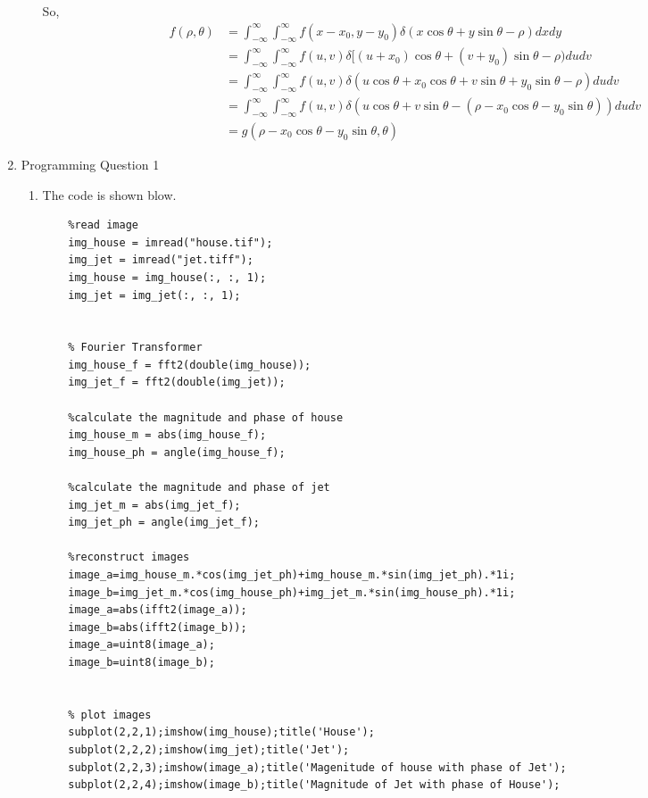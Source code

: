 \documentclass[12pt]{article}
\begin{document}
\begin{enumerate}[leftmargin=\labelsep]
\begin{enumerate}
    So, 
    \begin{equation}
        \begin{aligned}
                f(\rho, \theta)
                &= \int_{-\infty}^{\infty}\int_{-\infty}^{\infty}f(x - x_0, y - y_0) \delta(x\cos\theta + y\sin\theta - \rho)dxdy\\
                &= \int_{-\infty}^{\infty}\int_{-\infty}^{\infty}f(u, v)\delta[(u + x_0)\cos\theta + (v + y_0)\sin\theta - \rho)dudv\\
                &= \int_{-\infty}^{\infty}\int_{-\infty}^{\infty}f(u, v)\delta(u\cos\theta + x_0\cos\theta + v\sin\theta + y_0\sin\theta - \rho)dudv\\
                &= \int_{-\infty}^{\infty}\int_{-\infty}^{\infty}f(u, v)\delta(u\cos\theta + v\sin\theta - (\rho - x_0\cos\theta - y_0\sin\theta))dudv\\
                &= g(\rho - x_0\cos\theta - y_0\sin\theta, \theta)
        \end{aligned}
    \end{equation}    

\end{enumerate}

\item Programming Question 1 
\begin{enumerate}
\item The code is shown blow.
\begin{lstlisting}
    %read image
    img_house = imread("house.tif");
    img_jet = imread("jet.tiff");
    img_house = img_house(:, :, 1);
    img_jet = img_jet(:, :, 1);
    
    
    % Fourier Transformer
    img_house_f = fft2(double(img_house));
    img_jet_f = fft2(double(img_jet));
    
    %calculate the magnitude and phase of house
    img_house_m = abs(img_house_f);
    img_house_ph = angle(img_house_f);
    
    %calculate the magnitude and phase of jet
    img_jet_m = abs(img_jet_f);
    img_jet_ph = angle(img_jet_f); 
    
    %reconstruct images
    image_a=img_house_m.*cos(img_jet_ph)+img_house_m.*sin(img_jet_ph).*1i;
    image_b=img_jet_m.*cos(img_house_ph)+img_jet_m.*sin(img_house_ph).*1i;
    image_a=abs(ifft2(image_a));
    image_b=abs(ifft2(image_b));
    image_a=uint8(image_a);
    image_b=uint8(image_b);
    
    
    % plot images
    subplot(2,2,1);imshow(img_house);title('House');
    subplot(2,2,2);imshow(img_jet);title('Jet');
    subplot(2,2,3);imshow(image_a);title('Magenitude of house with phase of Jet');
    subplot(2,2,4);imshow(image_b);title('Magnitude of Jet with phase of House');
\end{lstlisting}


\end{enumerate}
\end{enumerate}
\end{document}

